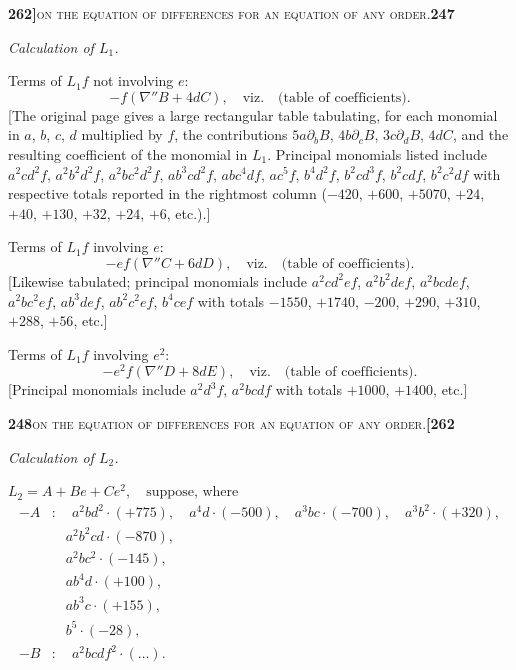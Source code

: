 \documentclass[11pt]{article}
\begin{document}
\newpage
\noindent\textbf{262]}\hfill\textsc{on the equation of differences for an equation of any order.}\hfill\textbf{247}

\medskip

\noindent\textit{Calculation of $L_1$.}

\medskip

\noindent Terms of $L_1 f$ not involving $e$:
\[
  -f(\nabla'' B + 4 d C), \quad\text{viz.}\quad\text{(table of coefficients)}.
\]
[The original page gives a large rectangular table tabulating, for each monomial in $a$, $b$, $c$, $d$ multiplied by $f$, the contributions $5a\partial_b B$, $4b\partial_c B$, $3c\partial_d B$, $4 d C$, and the resulting coefficient of the monomial in $L_1$. Principal monomials listed include $a^2 c d^2 f$, $a^2 b^2 d^2 f$, $a^2 b c^2 d^2 f$, $a b^3 c d^2 f$, $a b c^4 d f$, $a c^5 f$, $b^4 d^2 f$, $b^2 c d^3 f$, $b^2 c d f$, $b^2 c^2 d f$ with respective totals reported in the rightmost column ($-420$, $+600$, $+5070$, $+24$, $+40$, $+130$, $+32$, $+24$, $+6$, etc.).]

\medskip

\noindent Terms of $L_1 f$ involving $e$:
\[
  -e f(\nabla'' C + 6 d D), \quad\text{viz.}\quad\text{(table of coefficients)}.
\]
[Likewise tabulated; principal monomials include $a^2 c d^2 e f$, $a^2 b^2 d e f$, $a^2 b c d e f$, $a^2 b c^2 e f$, $a b^3 d e f$, $a b^2 c^2 e f$, $b^4 c e f$ with totals $-1550$, $+1740$, $-200$, $+290$, $+310$, $+288$, $+56$, etc.]

\medskip

\noindent Terms of $L_1 f$ involving $e^2$:
\[
  -e^2 f(\nabla'' D + 8 d E), \quad\text{viz.}\quad\text{(table of coefficients)}.
\]
[Principal monomials include $a^2 d^3 f$, $a^2 b c d f$ with totals $+1000$, $+1400$, etc.]

\newpage
\noindent\textbf{248}\hfill\textsc{on the equation of differences for an equation of any order.}\hfill\textbf{[262}

\medskip

\noindent\textit{Calculation of $L_2$.}

\medskip

\noindent $L_2 = A + B e + C e^2,\quad\text{suppose, where}$
\[
\begin{aligned}
  -A &:\quad a^2 b d^2 \cdot (+775),\quad a^4 d \cdot (-500),\quad a^3 b c \cdot (-700),\quad a^3 b^2 \cdot (+320),\\
       &\quad a^2 b^2 c d \cdot (-870),\\
       &\quad a^2 b c^2 \cdot (-145),\\
       &\quad a b^4 d \cdot (+100),\\
       &\quad a b^3 c \cdot (+155),\\
       &\quad b^5 \cdot (-28),\\
  -B &:\quad a^2 b c d f^2 \cdot (\ldots).
\end{aligned}
\]
\end{document}
